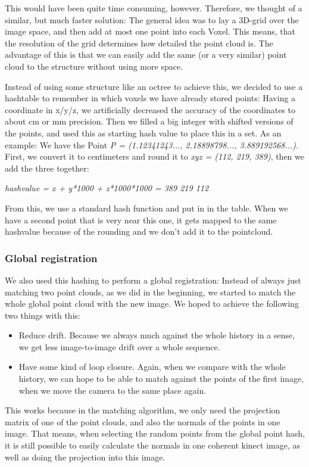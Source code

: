 \documentclass[10pt,twocolumn,letterpaper]{article}
\begin{document}
This would have been quite time consuming, however. Therefore, we thought of a similar, but much faster solution:
The general idea was to lay a 3D-grid over the image space, and then add at most one point into each Voxel. This means, that the resolution
of the grid determines how detailed the point cloud is. The advantage of this is that we can easily add the same (or a very similar) point cloud
to the structure without using more space.

Instead of using some structure like an octree to achieve this, we decided to use a hashtable to remember in which voxels we have already stored points:
Having a coordinate in x/y/z, we artificially decreased the accuracy of the coordinates to about cm or mm precision. Then we filled a big integer with
shifted versions of the points, and used this as starting hash value to place this in a set. As an example: We have the Point
\textit{P = (1.12341243..., 2.18898798..., 3.889192568...)}. First, we convert it to centimeters and round
it to \textit{xyz = (112, 219, 389)}, then we add the three together:

\textit{hashvalue = x + y*1000 + z*1000*1000 = 389 219 112}

From this, we use a standard hash function and put in in the table. When we have a second
point that is very near this one, it gets mapped to the same hashvalue because of the rounding and we don't add it to the pointcloud.

\subsubsection{Global registration}
We also used this hashing to perform a global registration: Instead of always just matching two point clouds, as we did in the beginning, we started
to match the whole global point cloud with the new image. We hoped to achieve the following two things with this:
\begin{itemize}
\item Reduce drift. Because we always much against the whole history in a sense, we get less image-to-image drift over a whole sequence.
\item Have some kind of loop closure. Again, when we compare with the whole history, we can hope to be able to match against
the points of the first image, when we move the camera to the same place again.
\end{itemize}

This works because in the matching algorithm, we only need the projection matrix of
one of the point clouds, and also the normals of the points in one image. That means, when selecting the random points from the global point hash, it is
still possible to easily calculate the normals in one coherent kinect image, as well as doing the projection into this image.
\end{document}
